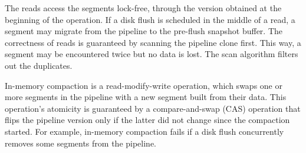 The reads access the segments lock-free, through the version obtained at the beginning of the operation. If a disk flush
is scheduled in the middle of a read, a segment may migrate from the pipeline to the pre-flush snapshot buffer. The correctness of
reads  is guaranteed by scanning the pipeline clone first. This way, a segment may be encountered twice but no data is 
lost. The scan algorithm filters out the duplicates. 

In-memory compaction is a read-modify-write operation, which swaps one or more segments in the pipeline 
with a new segment built from their data. This operation's atomicity is guaranteed by a compare-and-swap (CAS) operation
that flips the pipeline version only if the latter did not change since the compaction started.  For example, in-memory
compaction fails if a disk flush concurrently removes some segments from the pipeline.


